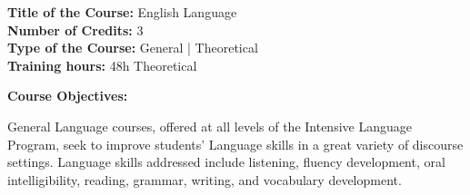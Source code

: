 \documentclass[12pt,a4paper]{article}
\begin{document}
\newpage
\nopagebreak
\textbf{Title of the Course:} English Language\\
\textbf{Number of Credits:} 3\\
\textbf{Type of the Course:} General | Theoretical\\
\textbf{Training hours:} 48h Theoretical\par\vspace{4pt}
\textbf{Course Objectives:}\par\vspace{2pt}
General Language courses, offered at all levels of the Intensive Language Program, seek to
improve students' Language skills in a great variety of discourse settings. Language skills
addressed include listening, fluency development, oral intelligibility, reading, grammar, writing,
and vocabulary development.\par\vspace{4pt}
\end{document}
